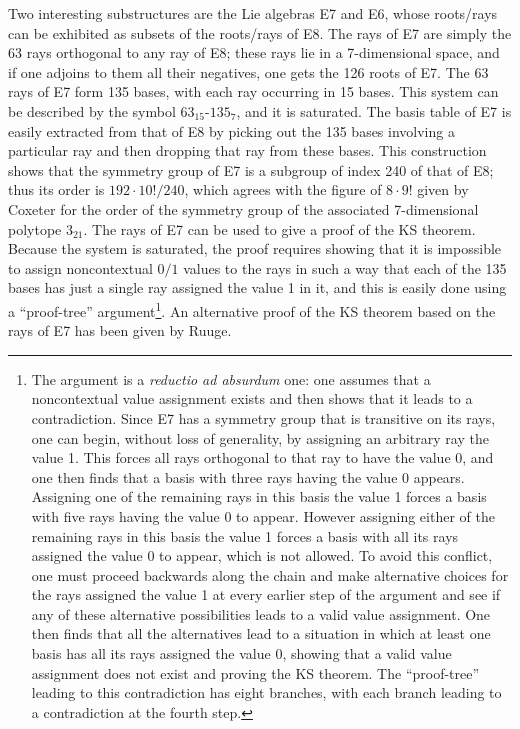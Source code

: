 Two interesting substructures are the Lie algebras E7 and E6, whose roots/rays can be exhibited as subsets of the roots/rays of E8. The rays of E7 are simply the 63 rays orthogonal to any ray of E8; these rays lie in a 7-dimensional space, and if one adjoins to them all their negatives, one gets the 126 roots of E7. The 63 rays of E7 form 135 bases, with each ray occurring in 15 bases. This system can be described by the symbol $63_{15}$-$135_{7}$, and it is saturated. The basis table of E7 is easily extracted from that of E8 by picking out the 135 bases involving a particular ray and then dropping that ray from these bases. This construction shows that the symmetry group of E7 is a subgroup of index 240 of that of E8; thus its order is $192 \cdot 10!/240$, which agrees with the figure of $8\cdot 9!$ given by Coxeter for the order of the symmetry group of the associated 7-dimensional polytope $3_{21}$. The rays of E7 can be used to give a proof of the KS theorem. Because the system is saturated, the proof requires showing that it is impossible to assign noncontextual $0/1$ values to the rays in such a way that each of the 135 bases has just a single ray assigned the value 1 in it, and this is easily done using a ``proof-tree'' argument\footnote {The argument is a \textit{reductio ad absurdum} one: one assumes that a noncontextual value assignment exists and then shows that it leads to a contradiction. Since E7 has a symmetry group that is transitive on its rays, one can begin, without loss of generality, by assigning an arbitrary ray the value 1. This forces all rays orthogonal to that ray to have the value 0, and one then finds that a basis with three rays having the value 0 appears. Assigning one of the remaining rays in this basis the value 1 forces a basis with five rays having the value 0 to appear. However assigning either of the remaining rays in this basis the value 1 forces a basis with all its rays assigned the value 0 to appear, which is not allowed. To avoid this conflict, one must proceed backwards along the chain and make alternative choices for the rays assigned the value 1 at every earlier step of the argument and see if any of these alternative possibilities leads to a valid value assignment. One then finds that all the alternatives lead to a situation in which at least one basis has all its rays assigned the value 0, showing that a valid value assignment does not exist and proving the KS theorem. The ``proof-tree'' leading to this contradiction has eight branches, with each branch leading to a contradiction at the fourth step.}. An alternative proof of the KS theorem based on the rays of E7 has been given by Ruuge\cite{ruugeE6}.\\


